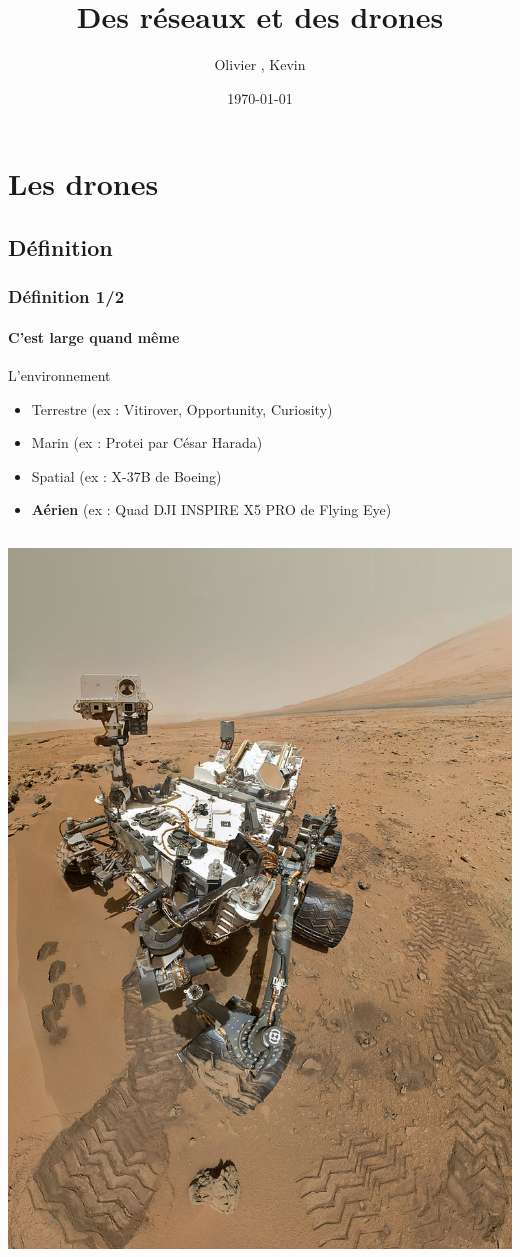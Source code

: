 \documentclass{beamer}
\title{Des réseaux et des drones}
\author{Olivier \bsc{Boissard}, Kevin \bsc{Boulala}}
\institute{Université de Franche Comté}
\date{\today}
\begin{document}
\begin{frame}
  \titlepage
\end{frame}

\begin{frame}
	\tableofcontents[]
\end{frame}

\section{Les drones}
\subsection{Définition}
\begin{frame}
  \frametitle{Définition 1/2}
  \framesubtitle{C'est large quand même}
  \begin{block}{L'environnement}
    \begin{itemize}
      \item Terrestre (ex : Vitirover, Opportunity, Curiosity)
      \item Marin (ex : Protei par César Harada)
      \item Spatial (ex : X-37B de Boeing)
      \item \textbf{Aérien} (ex : Quad DJI INSPIRE X5 PRO de Flying Eye)
    \end{itemize}
  \end{block}
  \begin{columns}
    \begin{column}{.25\textwidth}
      \includegraphics[width=\textwidth]{../Images/Curiosity.jpg}

\end{column}
\end{columns}
\end{frame}
\end{document}
